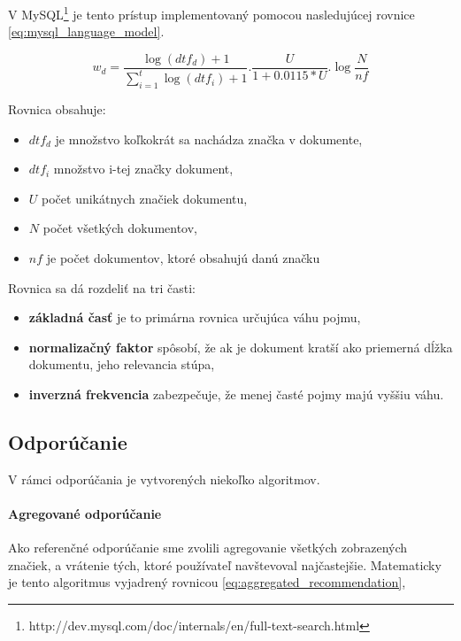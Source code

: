 V MySQL\footnote{http://dev.mysql.com/doc/internals/en/full-text-search.html}
je tento prístup implementovaný pomocou nasledujúcej 
rovnice \ref{eq:mysql_language_model}.

\begin{equation}\label{eq:mysql_language_model}
    w_d = \frac{\log(dtf_d) + 1}{\sum_{i=1}^{t} \log (dtf_i) + 1} .
        \frac{U}{1+0.0115 * U} .
        \log \frac {N}{nf}
\end{equation}

Rovnica obsahuje:
\begin{itemize}
\item{\(dtf_d\) je množstvo koľkokrát sa nachádza značka v dokumente,}
\item{\(dtf_i\) množstvo i-tej značky dokument,}
\item{\(U\) počet unikátnych značiek dokumentu, }
\item{\(N\) počet všetkých dokumentov, }
\item{\(nf\) je počet dokumentov, ktoré obsahujú danú značku}
\end{itemize}

Rovnica sa dá rozdeliť na tri časti:

\begin{itemize}
\item{\textbf{základná časť} je to primárna rovnica určujúca váhu pojmu,}
\item{\textbf{normalizačný faktor} spôsobí, že ak je dokument kratší ako priemerná dĺžka
dokumentu, jeho relevancia stúpa, \cite{pivoted_doc_len}}
\item{\textbf{inverzná frekvencia} zabezpečuje, že menej časté pojmy majú vyššiu váhu.}
\end{itemize}

\subsection{Odporúčanie}

V rámci odporúčania je vytvorených niekoľko algoritmov.

\paragraph{Agregované odporúčanie}

Ako referenčné odporúčanie sme zvolili agregovanie všetkých zobrazených značiek, a vrátenie
tých, ktoré používateľ navštevoval najčastejšie. Matematicky je tento algoritmus vyjadrený
rovnicou \ref{eq:aggregated_recommendation},

